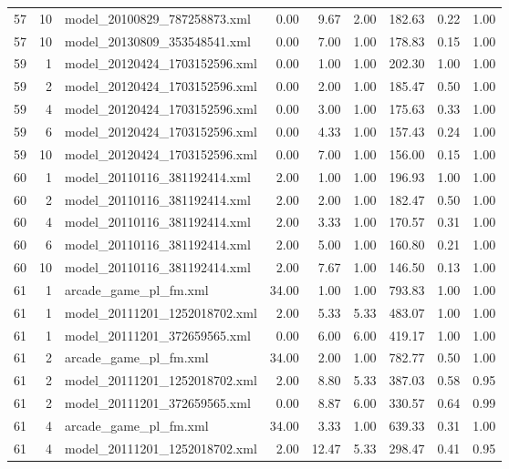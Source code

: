 \begin{table}[ht]
\begin{tabular}{rrlrrrrrr}
   57 &  10 & model\_20100829\_787258873.xml & 0.00 & 9.67 & 2.00 & 182.63 & 0.22 & 1.00 \\ 
   57 &  10 & model\_20130809\_353548541.xml & 0.00 & 7.00 & 1.00 & 178.83 & 0.15 & 1.00 \\ 
   59 &   1 & model\_20120424\_1703152596.xml & 0.00 & 1.00 & 1.00 & 202.30 & 1.00 & 1.00 \\ 
   59 &   2 & model\_20120424\_1703152596.xml & 0.00 & 2.00 & 1.00 & 185.47 & 0.50 & 1.00 \\ 
   59 &   4 & model\_20120424\_1703152596.xml & 0.00 & 3.00 & 1.00 & 175.63 & 0.33 & 1.00 \\ 
   59 &   6 & model\_20120424\_1703152596.xml & 0.00 & 4.33 & 1.00 & 157.43 & 0.24 & 1.00 \\ 
   59 &  10 & model\_20120424\_1703152596.xml & 0.00 & 7.00 & 1.00 & 156.00 & 0.15 & 1.00 \\ 
   60 &   1 & model\_20110116\_381192414.xml & 2.00 & 1.00 & 1.00 & 196.93 & 1.00 & 1.00 \\ 
   60 &   2 & model\_20110116\_381192414.xml & 2.00 & 2.00 & 1.00 & 182.47 & 0.50 & 1.00 \\ 
   60 &   4 & model\_20110116\_381192414.xml & 2.00 & 3.33 & 1.00 & 170.57 & 0.31 & 1.00 \\ 
   60 &   6 & model\_20110116\_381192414.xml & 2.00 & 5.00 & 1.00 & 160.80 & 0.21 & 1.00 \\ 
   60 &  10 & model\_20110116\_381192414.xml & 2.00 & 7.67 & 1.00 & 146.50 & 0.13 & 1.00 \\ 
   61 &   1 & arcade\_game\_pl\_fm.xml & 34.00 & 1.00 & 1.00 & 793.83 & 1.00 & 1.00 \\ 
   61 &   1 & model\_20111201\_1252018702.xml & 2.00 & 5.33 & 5.33 & 483.07 & 1.00 & 1.00 \\ 
   61 &   1 & model\_20111201\_372659565.xml & 0.00 & 6.00 & 6.00 & 419.17 & 1.00 & 1.00 \\ 
   61 &   2 & arcade\_game\_pl\_fm.xml & 34.00 & 2.00 & 1.00 & 782.77 & 0.50 & 1.00 \\ 
   61 &   2 & model\_20111201\_1252018702.xml & 2.00 & 8.80 & 5.33 & 387.03 & 0.58 & 0.95 \\ 
   61 &   2 & model\_20111201\_372659565.xml & 0.00 & 8.87 & 6.00 & 330.57 & 0.64 & 0.99 \\ 
   61 &   4 & arcade\_game\_pl\_fm.xml & 34.00 & 3.33 & 1.00 & 639.33 & 0.31 & 1.00 \\ 
   61 &   4 & model\_20111201\_1252018702.xml & 2.00 & 12.47 & 5.33 & 298.47 & 0.41 & 0.95 \\ 

\end{tabular}
\end{table}

